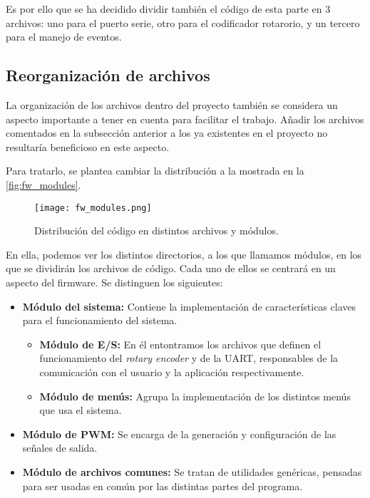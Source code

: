 Es por ello que se ha decidido dividir también el código de esta parte en 3 archivos: uno para el puerto serie, otro para el codificador rotarorio, y un tercero para el manejo de eventos.

\subsection{Reorganización de archivos}

La organización de los archivos dentro del proyecto también se considera un aspecto importante a tener en cuenta para facilitar el trabajo. Añadir los archivos comentados en la subsección anterior a los ya existentes en el proyecto no resultaría beneficioso en este aspecto.

Para tratarlo, se plantea cambiar la distribución a la mostrada en la \autoref{fig:fw_modules}.

\begin{figure}[ht]
    \centering
	\texttt{[image: fw\_modules.png]}
	\caption{Distribución del código en distintos archivos y módulos.}
    \label{fig:fw_modules}
\end{figure}

En ella, podemos ver los distintos directorios, a los que llamamos módulos, en los que se dividirán los archivos de código. Cada uno de ellos se centrará en un aspecto del firmware. Se distinguen los siguientes:

\begin{itemize}
    \item\textbf{Módulo del sistema:} Contiene la implementación de características claves para el funcionamiento del sistema.
        \begin{itemize}
            \item\textbf{Módulo de E/S:} En él entontramos los archivos que definen el funcionamiento del \textit{rotary encoder} y de la UART, responsables de la comunicación con el usuario y la aplicación respectivamente.
            \item\textbf{Módulo de menús:} Agrupa la implementación de los distintos menús que usa el sistema.
        \end{itemize}
    \item\textbf{Módulo de PWM:} Se encarga de la generación y configuración de las señales de salida.
    \item\textbf{Módulo de archivos comunes:} Se tratan de utilidades genéricas, pensadas para ser usadas en común por las distintas partes del programa.
\end{itemize}


